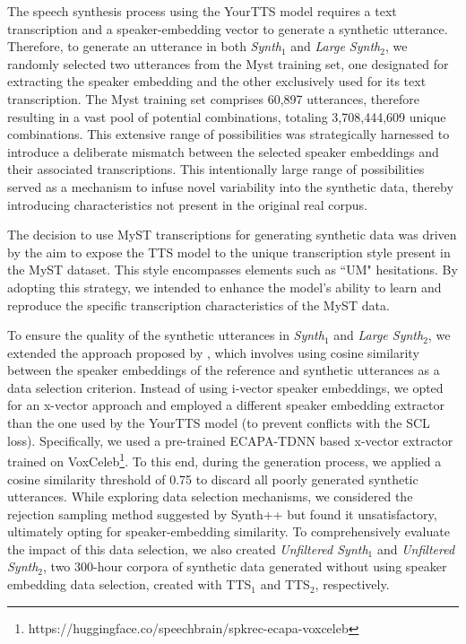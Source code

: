 The speech synthesis process using the YourTTS model requires a text transcription and a speaker-embedding vector to generate a synthetic utterance. Therefore, to generate an utterance in both \textit{Synth$_1$} and \textit{Large Synth$_2$}, we randomly selected two utterances from the Myst training set, one designated for extracting the speaker embedding and the other exclusively used for its text transcription. The Myst training set comprises 60,897 utterances, therefore resulting in a vast pool of potential combinations, totaling 3,708,444,609 unique combinations. This extensive range of possibilities was strategically harnessed to introduce a deliberate mismatch between the selected speaker embeddings and their associated transcriptions. This intentionally large range of possibilities served as a mechanism to infuse novel variability into the synthetic data, thereby introducing characteristics not present in the original real corpus.

The decision to use MyST transcriptions for generating synthetic data was driven by the aim to expose the \ac{TTS} model to the unique transcription style present in the MyST dataset. This style encompasses elements such as ``UM" hesitations. By adopting this strategy, we intended to enhance the model's ability to learn and reproduce the specific transcription characteristics of the MyST data.

To ensure the quality of the synthetic utterances in \textit{Synth$_1$} and \textit{Large Synth$_2$}, we extended the approach proposed by \cite{wang2021towards}, which involves using cosine similarity between the speaker embeddings of the reference and synthetic utterances as a data selection criterion. Instead of using i-vector speaker embeddings, we opted for an x-vector approach and employed a different speaker embedding extractor than the one used by the YourTTS model (to prevent conflicts with the \ac{SCL} loss). Specifically, we used a pre-trained ECAPA-TDNN \cite{desplanques20_interspeech} based x-vector extractor trained on VoxCeleb\footnote{https://huggingface.co/speechbrain/spkrec-ecapa-voxceleb}. To this end, during the generation process, we applied a cosine similarity threshold of 0.75 to discard all poorly generated synthetic utterances. While exploring data selection mechanisms, we considered the rejection sampling method suggested by Synth++ \cite{hu2022synt++} but found it unsatisfactory, ultimately opting for speaker-embedding similarity. To comprehensively evaluate the impact of this data selection, we also created \textit{Unfiltered Synth$_1$} and \textit{Unfiltered Synth$_2$}, two 300-hour corpora of synthetic data generated without using speaker embedding data selection, created with TTS$_1$ and TTS$_2$, respectively.

